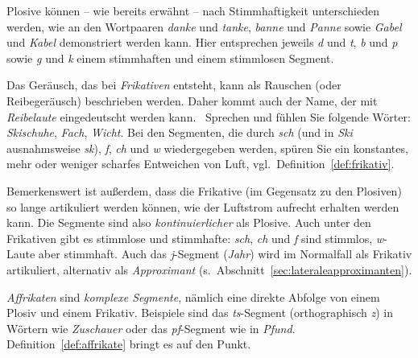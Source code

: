 
Plosive können -- wie bereits erwähnt -- nach Stimmhaftigkeit unterschieden werden, wie an den Wortpaaren \textit{danke} und \textit{tanke}, \textit{banne} und \textit{Panne} sowie \textit{Gabel} und \textit{Kabel} demonstriert werden kann.
Hier entsprechen jeweils \textit{d} und \textit{t}, \textit{b} und \textit{p} sowie \textit{g} und \textit{k} einem stimmhaften und einem stimmlosen Segment.

Das Geräusch, das bei \textit{Frikativen} entsteht, kann als Rauschen (oder Reibegeräusch) beschrieben werden.
Daher kommt auch der Name, der mit \textit{Reibelaute} eingedeutscht werden kann.
\TuBegin~Sprechen und fühlen Sie folgende Wörter: \textit{Skischuhe}, \textit{Fach}, \textit{Wicht}.
Bei den Segmenten, die durch \textit{sch} (und in \textit{Ski} ausnahmsweise \textit{sk}), \textit{f}, \textit{ch} und \textit{w} wiedergegeben werden, spüren Sie ein konstantes, mehr oder weniger scharfes Entweichen von Luft, vgl.\ Definition~\ref{def:frikativ}.


Bemerkenswert ist außerdem, dass die Frikative (im Gegensatz zu den Plosiven) so lange artikuliert werden können, wie der Luftstrom aufrecht erhalten werden kann.
Die Segmente sind also \textit{kontinuierlicher} als Plosive.
Auch unter den Frikativen gibt es stimmlose und stimmhafte: \textit{sch}, \textit{ch} und \textit{f} sind stimmlos, \textit{w}-Laute aber \zB stimmhaft.
Auch das \textit{j}-Segment (\textit{Jahr}) wird im Normalfall als Frikativ artikuliert, alternativ als \textit{Approximant} (s.\ Abschnitt~\ref{sec:lateraleapproximanten}).

\textit{Affrikaten} sind \textit{komplexe Segmente}, nämlich eine direkte Abfolge von einem Plosiv und einem Frikativ.
Beispiele sind das \textit{ts}-Segment (orthographisch \textit{z}) in Wörtern wie \textit{Zuschauer} oder das \textit{pf}-Segment wie in \textit{Pfund}.
Definition~\ref{def:affrikate} bringt es auf den Punkt.

